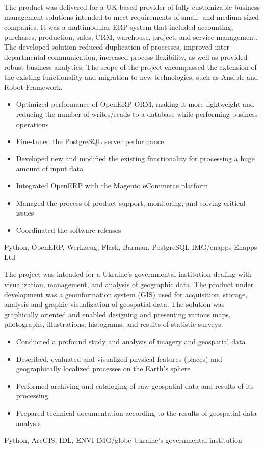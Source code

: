 \documentclass[paper=a4,fontsize=11pt]{temp} %
\begin{document}
\sepspace
\clearpage

{The product was delivered for a UK-based provider of fully customizable business management solutions intended to meet
requirements of small- and medium-sized companies. It was a multimodular ERP system that included accounting,
purchases, production, sales, CRM, warehouse, project, and service management. The developed solution reduced
duplication of processes, improved inter-departmental communication, increased process flexibility, as well as provided
robust business analytics.
The scope of the project encompassed the extension of the existing functionality and migration to new technologies, such as
Ansible and Robot Framework.}
{
\begin{itemize}
    \setlength\itemsep{0em}
    \item Optimized performance of OpenERP ORM, making it more lightweight and reducing the number of writes/reads to a database while
performing business operations
    \item Fine-tuned the PostgreSQL server performance
    \item Developed new and modified the existing functionality for processing a huge amount of input data
    \item Integrated OpenERP with the Magento eCommerce platform
    \item Managed the process of product support, monitoring, and solving critical issues
    \item Coordinated the software releases
\end{itemize}
}
{Python, OpenERP, Werkzeug, Flask, Barman, PostgreSQL}
{IMG/enapps}
{Enapps Ltd}

\sepspace

{The project was intended for a Ukraine’s governmental institution dealing with visualization, management, and analysis
of geographic data. The product under development was a geoinformation system (GIS) used for acquisition, storage,
analysis and graphic visualization of geospatial data. The solution was graphically oriented and enabled designing and
presenting various maps, photographs, illustrations, histograms, and results of statistic surveys.}
{
\begin{itemize}
    \setlength\itemsep{0em}
    \item Conducted a profound study and analysis of imagery and geospatial data 
    \item Described, evaluated and visualized physical features (places) and geographically localized processes on the
        Earth's sphere
    \item Performed archiving and cataloging of raw geospatial data and results of its processing
    \item Prepared technical documentation according to the results of geospatial data analysis
\end{itemize}
}
{Python, ArcGIS, IDL, ENVI}
{IMG/globe}
{Ukraine’s governmental institution}
\end{document}
